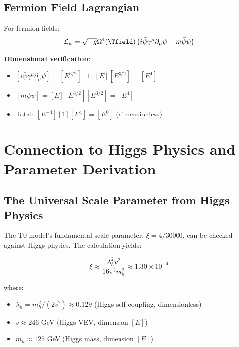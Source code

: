 	\subsection{Fermion Field Lagrangian}
	\label{subsec:fermion_field_lagrangian}
	
	For fermion fields:
	\begin{equation}
		\mathcal{L}_\psi = \sqrt{-g} \Omega^4(\Tfield) \left(i\bar{\psi}\gamma^\mu\partial_\mu\psi - m\bar{\psi}\psi\right)
		\label{eq:fermion_lagrangian}
	\end{equation}
	
	\textbf{Dimensional verification}:
	\begin{itemize}
		\item $[i\bar{\psi}\gamma^\mu\partial_\mu\psi] = [E^{3/2}][1][E][E^{3/2}] = [E^4]$
		\item $[m\bar{\psi}\psi] = [E][E^{3/2}][E^{3/2}] = [E^4]$
		\item Total: $[E^{-4}][1][E^4] = [E^0]$ (dimensionless) \checkmark
	\end{itemize}
	
	\section{Connection to Higgs Physics and Parameter Derivation}
	\label{sec:higgs_parameter_connection}
	
	\subsection{The Universal Scale Parameter from Higgs Physics}
	\label{subsec:universal_scale_parameter}
	
	The T0 model's fundamental scale parameter, $\xi = 4/30000$, can be checked against Higgs physics. The calculation yields:
	
	\begin{equation}
		\boxed{\xi \approx \frac{\lambda_h^2 v^2}{16\pi^3 m_h^2} \approx 1.30 \times 10^{-4}}
		\label{eq:xi_higgs_universal}
	\end{equation}
	
	where:
	\begin{itemize}
		\item $\lambda_h = m_h^2/(2v^2) \approx 0.129$ (Higgs self-coupling, dimensionless)
		\item $v \approx 246$ GeV (Higgs VEV, dimension $[E]$)
		\item $m_h \approx 125$ GeV (Higgs mass, dimension $[E]$)
	\end{itemize}
	
